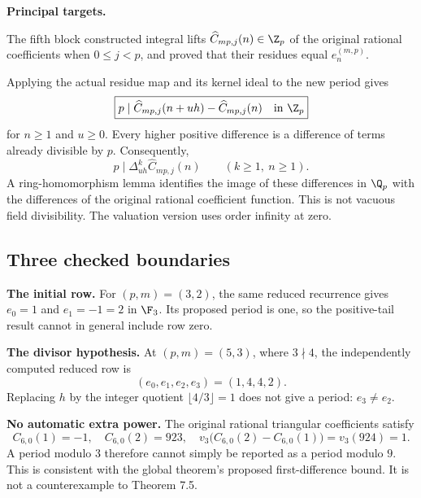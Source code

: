 \textbf{Principal targets.}\par
{}\par
{}\par
{}\par
{}

\par\medskip
{}
The fifth block constructed integral lifts $\widehat C_{mp,j}(n)\in\Z_p$ of the original rational coefficients when $0\le j<p$, and proved that their residues equal $e_n^{(m,p)}$.

Applying the actual residue map and its kernel ideal to the new period gives
\[
 \boxed{p\mid\widehat C_{mp,j}(n+uh)-\widehat C_{mp,j}(n)
       \quad\hbox{in }\Z_p}
\]
for $n\ge1$ and $u\ge0$. Every higher positive difference is a difference of terms already divisible by $p$. Consequently,
\[
 p\mid\Delta_{uh}^{k}\widehat C_{mp,j}(n)\qquad(k\ge1,\ n\ge1).
\]
A ring-homomorphism lemma identifies the image of these differences in $\Q_p$ with the differences of the original rational coefficient function. This is not vacuous field divisibility. The valuation version uses order infinity at zero.

\subsection*{Three checked boundaries}
\textbf{The initial row.} For $(p,m)=(3,2)$, the same reduced recurrence gives $e_0=1$ and $e_1=-1=2$ in $\F_3$. Its proposed period is one, so the positive-tail result cannot in general include row zero.

\textbf{The divisor hypothesis.} At $(p,m)=(5,3)$, where $3\nmid4$, the independently computed reduced row is
\[
 (e_0,e_1,e_2,e_3)=(1,4,4,2).
\]
Replacing $h$ by the integer quotient $\lfloor4/3\rfloor=1$ does not give a period: $e_3\ne e_2$.

\textbf{No automatic extra power.} The original rational triangular coefficients satisfy
\[
 C_{6,0}(1)=-1,\quad C_{6,0}(2)=923,\quad
 v_3\bigl(C_{6,0}(2)-C_{6,0}(1)\bigr)=v_3(924)=1.
\]
A period modulo $3$ therefore cannot simply be reported as a period modulo $9$. This is consistent with the global theorem's proposed first-difference bound. It is not a counterexample to Theorem 7.5.

